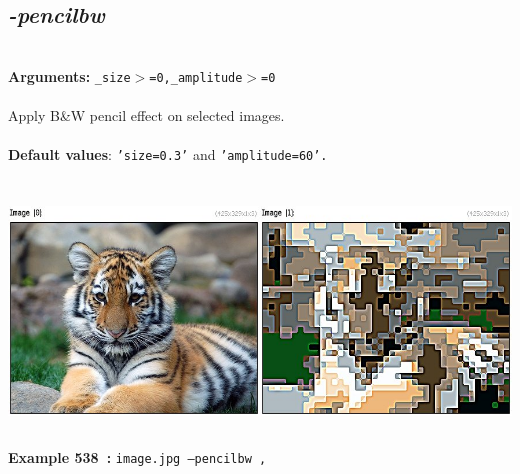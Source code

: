 \documentclass[a4paper,11pt,twoside]{book}
\begin{document}
\subsection{\emph{-pencilbw} }\vspace*{-0.5em}
~\\\textbf{Arguments: } 
{\small \texttt{\_size$>$=0,\_amplitude$>$=0}}\\~\\
Apply B\&W pencil effect on selected images.
~\\~\\\textbf{Default values}: {\small \texttt{'size=0.3'} and \texttt{'amplitude=60'.}}
\begin{center}\includegraphics[keepaspectratio=true,height=7cm,width=\textwidth]{img/gmic_def538.jpg}\\
{\footnotesize \textbf{Example 538~:} \texttt{image.jpg --pencilbw ,}}
\end{center}
\end{document}

